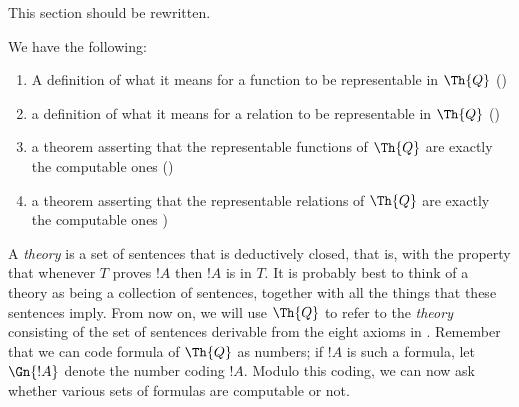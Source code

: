\documentclass[../../../include/open-logic-section]{subfiles}
\begin{document}


\begin{editorial}
This section should be rewritten.  
\end{editorial}

We have the following:
\begin{enumerate}
\item A definition of what it means for a function to be representable
  in $\Th{Q}$ ()
\item a definition of what it means for a relation to be representable
  in $\Th{Q}$ ()
\item a theorem asserting that the representable functions of $\Th{Q}$
  are exactly the computable ones
  ()
\item a theorem asserting that the representable relations of $\Th{Q}$
  are exactly the computable ones
  )
\end{enumerate}

A {\em theory} is a set of sentences that is deductively closed, that
is, with the property that whenever $T$ proves $!A$ then $!A$ is in
$T$. It is probably best to think of a theory as being a collection of
sentences, together with all the things that these sentences imply.
From now on, we will use $\Th{Q}$ to refer to the {\em theory}
consisting of the set of sentences derivable from the eight axioms in
.  Remember that we can code formula of $\Th{Q}$
as numbers; if $!A$ is such a formula, let $\Gn{!A}$ denote the number
coding $!A$. Modulo this coding, we can now ask whether various sets
of formulas are computable or not.
\end{document}

